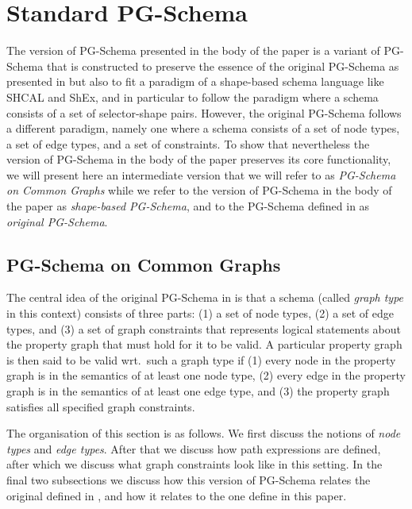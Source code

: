 
\section{Standard PG-Schema}
\label{sec:standard-pg-schema}


The version of PG-Schema presented in the body of the paper is a variant of PG-Schema that is constructed to preserve the essence of the original PG-Schema as presented in \cite{ABDF23} but also to fit a paradigm of a shape-based schema language like SHCAL and ShEx, and in particular to follow the paradigm where a schema consists of a set of selector-shape pairs. 
However, the original PG-Schema follows a different paradigm, namely one where a schema consists of a set of node types, a set of edge types, and a set of constraints.
To show that nevertheless the version of PG-Schema in the body of the paper preserves its core functionality, we will present here an intermediate version that we will refer to as \emph{PG-Schema on Common Graphs} while we refer to the version of PG-Schema in the body of the paper as \emph{shape-based PG-Schema}, and to the PG-Schema defined in \cite{ABDF23} as \emph{original PG-Schema}.

\subsection{PG-Schema on Common Graphs}

The central idea of the original PG-Schema in \cite{ABDF23} 
is that a schema (called \emph{graph type} 
in this context) consists of three parts: (1) a set of node types, 
(2) a set of edge types, and (3) a set of graph constraints
that represents logical statements about the property graph that must hold for it to be valid.  
A particular property graph is then said to be valid wrt.\ such a graph type if (1) every node 
in the property graph is in the semantics of at least one node type, (2) every edge in the property graph 
is in the semantics of at least one edge type, and (3) the property graph satisfies all specified graph constraints.

The organisation of this section is as follows. We first discuss the notions of \emph{node types} and \emph{edge types}.
After that we discuss how path expressions are defined, after which we discuss what graph constraints look like in this setting.
In the final two subsections we discuss how this version of PG-Schema relates the original defined in
\cite{ABDF23}, and how it relates to the one define in this paper.

